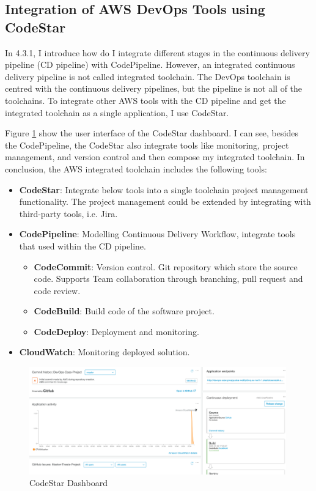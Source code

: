 \subsection{Integration of AWS DevOps Tools using CodeStar}
In 4.3.1, I introduce how do I integrate different stages in the continuous delivery pipeline (CD pipeline) with CodePipeline. However, an integrated continuous delivery pipeline is not called integrated toolchain. The DevOps toolchain is centred with the continuous delivery pipelines, but the pipeline is not all of the toolchains. To integrate other AWS tools with the CD pipeline and get the integrated toolchain as a single application, I use CodeStar.  
\par
Figure \ref{fig:codestar} show the user interface of the CodeStar dashboard. I can see, besides the CodePipeline, the CodeStar also integrate tools like monitoring, project management, and version control and then compose my integrated toolchain. In conclusion, the AWS integrated toolchain includes the following tools:\label{codestar}
\begin{itemize}
     \item \textbf{CodeStar}: Integrate below tools into a single toolchain project management functionality. The project management could be extended by integrating with third-party tools, i.e. Jira.
          \item \textbf{CodePipeline}: Modelling Continuous Delivery Workflow, integrate tools that used within the CD pipeline.
          \begin{itemize}
               \item \textbf{CodeCommit}: Version control. Git repository which store the source code. Supports Team collaboration through branching, pull request and code review.
               \item \textbf{CodeBuild}: Build code of the software project.
               \item \textbf{CodeDeploy}: Deployment and monitoring. 
          \end{itemize}
          \item \textbf{CloudWatch}: Monitoring deployed solution.
\end{itemize}
\begin{figure}[h]
     \centering
     \includegraphics[width=0.99\textwidth]{pics/codestar.png}
     \caption{CodeStar Dashboard}
     \label{fig:codestar}
    \end{figure}

